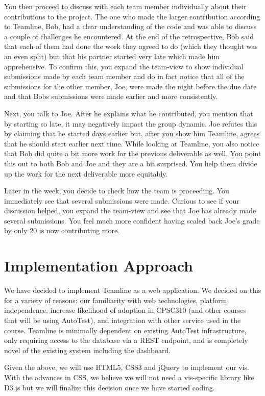 \documentclass[preprint,journal]{vgtc}       %
\begin{document}
You then proceed to discuss with each team member individually about their contributions
to the project. The one who made the larger contribution according to Teamline, Bob,
had a clear understanding of the code and was able to discuss a couple of challenges
he encountered. At the end of the retrospective, Bob said that each of them had
done the work they agreed to do (which they thought was an even split) but that
his partner started very late which made him apprehensive.
To confirm this, you expand the team-view to show individual submissions made by
each team member and do in fact notice that all of the submissions for the other
member, Joe, were made the night before the due date and that Bobs submissions were
made earlier and more consistently.

Next, you talk to Joe. After he explains what he contributed, you mention that by
starting so late, it may negatively impact the group dynamic. Joe refutes this by claiming
that he started days earlier but, after you show him Teamline, agrees that he should
start earlier next time. While looking at Teamline, you also notice that Bob did
quite a bit more work for the previous deliverable as well. You point this out to
both Bob and Joe and they are a bit surprised. You help them divide up the work
for the next deliverable more equitably.

Later in the week, you decide to check how the team is proceeding. You immediately
see that several submissions were made. Curious to see if your discussion helped,
you expand the team-view and see that Joe has already made several submissions.
You feel much more confident having scaled back Joe's grade by only 20%
is now contributing more.


\section{Implementation Approach}
We have decided to implement Teamline as a web application. We decided on this for
a variety of reasons: our familiarity with web technologies, platform independence,
increase likelihood of adoption in CPSC310 (and other courses that will be using AutoTest),
and integration with other service used in the course. Teamline is minimally dependent
on existing AutoTest infrastructure, only requiring access to the database via a
REST endpoint, and is completely novel of the existing system including the dashboard.

Given the above, we will use HTML5, CSS3 and jQuery to implement our vis. With the
advances in CSS, we believe we will not need a vis-specific library like D3.js but
we will finalize this decision once we have started coding.
\end{document}
